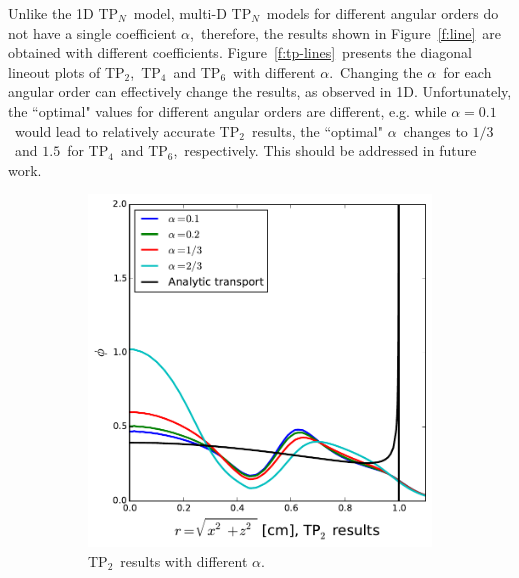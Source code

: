 \documentclass[review]{elsarticle}
\newcommand{\pn}{P$_N$}
\begin{document}
{Unlike the 1D T\pn\ model, multi-D T\pn\ models for different angular orders do not have a single coefficient $\alpha$,\ therefore, the results shown in Figure\ \ref{f:line}\ are obtained with different coefficients. Figure\ \ref{f:tp-lines}\ presents the diagonal lineout plots of TP$_2$,\ TP$_4$\ and TP$_6$\ with different $\alpha$.\ Changing the $\alpha$\ for each angular order can effectively change the results, as observed in 1D. Unfortunately, the ``optimal" values for different angular orders are different, e.g. while $\alpha=0.1$\ would lead to relatively accurate TP$_2$\ results, the ``optimal" $\alpha$\ changes to $1/3$\ and $1.5$\ for TP$_4$\ and TP$_6$,\ respectively. This should be addressed in future work.
\begin{figure}[ht!]
	\begin{subfigure}{.5\textwidth}
		\begin{center}
			\hspace*{-1cm}\includegraphics[width=1.\textwidth]{tp2-line.pdf}
			\caption[]{TP$_2$\ results with different $\alpha$.}%
			\label{f:tp2-line}
		\end{center}
	\end{subfigure}
	~
	\begin{subfigure}{.5\textwidth}

\end{subfigure}
\end{figure}}
\end{document}
